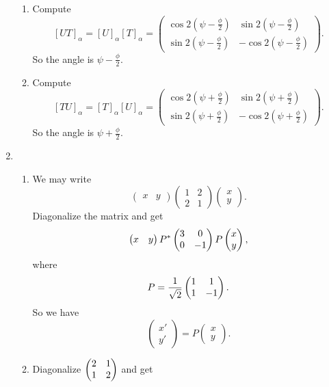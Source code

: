 \begin{enumerate}
\begin{enumerate}
\item Compute 
\[[UT]_{\alpha}=[U]_{\alpha}[T]_{\alpha}=\begin{pmatrix}\cos 2(\psi-\frac{\phi}{2}) &\sin 2(\psi-\frac{\phi}{2}) \\\sin 2(\psi-\frac{\phi}{2}) &-\cos 2(\psi-\frac{\phi}{2}) \end{pmatrix}.\]
So the angle is $\psi-\frac{\phi}{2}$.
\item Compute 
\[[TU]_{\alpha}=[T]_{\alpha}[U]_{\alpha}=\begin{pmatrix}\cos 2(\psi+\frac{\phi}{2}) &\sin 2(\psi+\frac{\phi}{2}) \\\sin 2(\psi+\frac{\phi}{2}) &-\cos 2(\psi+\frac{\phi}{2}) \end{pmatrix}.\]
So the angle is $\psi+\frac{\phi}{2}$.
\end{enumerate}
\item \begin{enumerate}
\item We may write 
\[\begin{pmatrix}x&y\end{pmatrix}\begin{pmatrix}1&2\\2&1\end{pmatrix}\begin{pmatrix}x\\y\end{pmatrix}.\]
Diagonalize the matrix and get 
\[\begin{pmatrix}x&y\end{pmatrix}P^*\begin{pmatrix}3 & 0\cr 0 & -1\end{pmatrix}P\begin{pmatrix}x\\y\end{pmatrix},\]
where  
\[P=\frac{1}{\sqrt{2}}\begin{pmatrix}1 & 1\cr 1 & -1\end{pmatrix}.\]
So we have 
\[\begin{pmatrix}x'\\y'\end{pmatrix}=P\begin{pmatrix}x\\y\end{pmatrix}.\]
\item Diagonalize $\begin{pmatrix}2 & 1\cr 1 & 2\end{pmatrix}$ and get 

\end{enumerate}
\end{enumerate}
